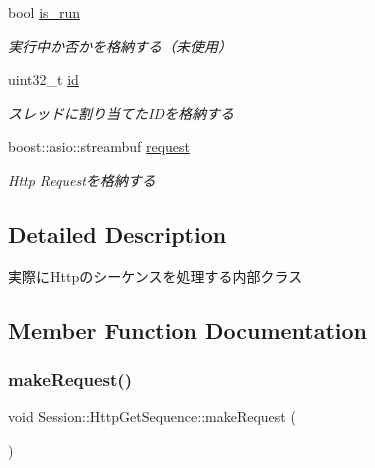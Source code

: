 \begin{DoxyCompactItemize}
bool \mbox{\hyperlink{class_session_1_1_http_get_sequence_a3ce12aa9298adc25900145fe16e874da}{is\+\_\+run}}
\begin{DoxyCompactList}\small\item\em 実行中か否かを格納する（未使用） \end{DoxyCompactList}\item 
\mbox{\label{class_session_1_1_http_get_sequence_a3b3a0b3b9aee4a74cef8eccdcf5bffb0}} 
uint32\+\_\+t \mbox{\hyperlink{class_session_1_1_http_get_sequence_a3b3a0b3b9aee4a74cef8eccdcf5bffb0}{id}}
\begin{DoxyCompactList}\small\item\em スレッドに割り当てた\+I\+Dを格納する \end{DoxyCompactList}\item 
\mbox{\label{class_session_1_1_http_get_sequence_a1354b58ca82453160fc4055fd1521bfb}} 
boost\+::asio\+::streambuf \mbox{\hyperlink{class_session_1_1_http_get_sequence_a1354b58ca82453160fc4055fd1521bfb}{request}}
\begin{DoxyCompactList}\small\item\em Http Requestを格納する \end{DoxyCompactList}\end{DoxyCompactItemize}


\subsection{Detailed Description}
実際に\+Httpのシーケンスを処理する内部クラス 

\subsection{Member Function Documentation}
\mbox{\label{class_session_1_1_http_get_sequence_aa2af851135d98396c135edac23f9a4a0}} 
\subsubsection{\texorpdfstring{makeRequest()}{makeRequest()}}
{\footnotesize\ttfamily void Session\+::\+Http\+Get\+Sequence\+::make\+Request (\begin{DoxyParamCaption}{ }\end{DoxyParamCaption})\hspace{0.3cm}{\ttfamily [private]}}



